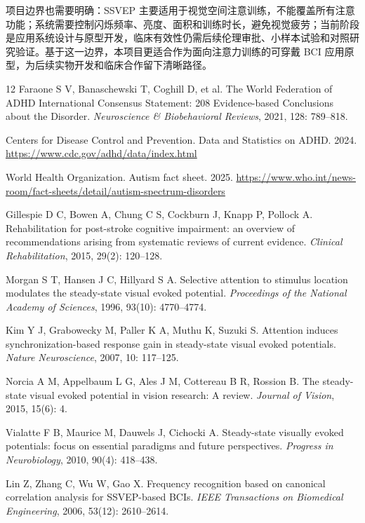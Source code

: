 \documentclass[UTF8,a4paper,zihao=5]{ctexart}
\begin{document}
项目边界也需要明确：SSVEP 主要适用于视觉空间注意训练，不能覆盖所有注意功能；系统需要控制闪烁频率、亮度、面积和训练时长，避免视觉疲劳；当前阶段是应用系统设计与原型开发，临床有效性仍需后续伦理审批、小样本试验和对照研究验证。基于这一边界，本项目更适合作为面向注意力训练的可穿戴 BCI 应用原型，为后续实物开发和临床合作留下清晰路径。

\begin{thebibliography}{12}
Faraone S V, Banaschewski T, Coghill D, et al.
The World Federation of ADHD International Consensus Statement: 208 Evidence-based Conclusions about the Disorder.
\textit{Neuroscience \& Biobehavioral Reviews}, 2021, 128: 789--818.

Centers for Disease Control and Prevention.
Data and Statistics on ADHD. 2024.
\url{https://www.cdc.gov/adhd/data/index.html}

World Health Organization.
Autism fact sheet. 2025.
\url{https://www.who.int/news-room/fact-sheets/detail/autism-spectrum-disorders}

Gillespie D C, Bowen A, Chung C S, Cockburn J, Knapp P, Pollock A.
Rehabilitation for post-stroke cognitive impairment: an overview of recommendations arising from systematic reviews of current evidence.
\textit{Clinical Rehabilitation}, 2015, 29(2): 120--128.

Morgan S T, Hansen J C, Hillyard S A.
Selective attention to stimulus location modulates the steady-state visual evoked potential.
\textit{Proceedings of the National Academy of Sciences}, 1996, 93(10): 4770--4774.

Kim Y J, Grabowecky M, Paller K A, Muthu K, Suzuki S.
Attention induces synchronization-based response gain in steady-state visual evoked potentials.
\textit{Nature Neuroscience}, 2007, 10: 117--125.

Norcia A M, Appelbaum L G, Ales J M, Cottereau B R, Rossion B.
The steady-state visual evoked potential in vision research: A review.
\textit{Journal of Vision}, 2015, 15(6): 4.

Vialatte F B, Maurice M, Dauwels J, Cichocki A.
Steady-state visually evoked potentials: focus on essential paradigms and future perspectives.
\textit{Progress in Neurobiology}, 2010, 90(4): 418--438.

Lin Z, Zhang C, Wu W, Gao X.
Frequency recognition based on canonical correlation analysis for SSVEP-based BCIs.
\textit{IEEE Transactions on Biomedical Engineering}, 2006, 53(12): 2610--2614.


\end{thebibliography}
\end{document}
